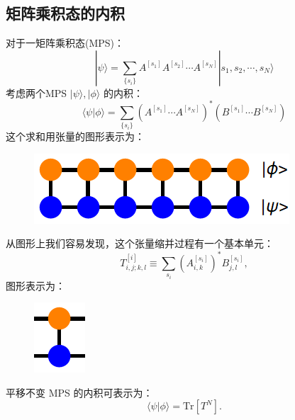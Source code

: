 \documentclass[UTF8]{ctexart}
\begin{document}
\subsection*{矩阵乘积态的内积}
\noindent
对于一矩阵乘积态(MPS)：
\begin{equation}
	|\psi\rangle = \sum_{\{s_i\}} A^{[s_1]}A^{[s_2]}\cdots A^{[s_N]} |s_1,s_2,\cdots,s_N\rangle
\end{equation}
考虑两个MPS $|\psi\rangle, |\phi\rangle$ 的内积：
\begin{equation}
	\langle\psi|\phi\rangle = \sum_{\{s_i\}} \left(A^{[s_1]}\cdots A^{[s_N]}\right)^* \left(B^{[s_1]}\cdots B^{[s_N]}\right)
\end{equation}
这个求和用张量的图形表示为：
\begin{figure}[H]
\begin{centering}
\includegraphics[width=0.5\linewidth]{include/mps-inner}
\par\end{centering}
\end{figure}
\noindent 
从图形上我们容易发现，这个张量缩并过程有一个基本单元：
\begin{equation}
	T^{[i]}_{i,j;k,l}\equiv \sum_{s_i} \left(A^{[s_i]}_{i,k}\right)^*B^{[s_i]}_{j,l},
\end{equation}
图形表示为：
\begin{figure}[H]
\begin{centering}
\includegraphics[width=0.1\linewidth]{include/mps-tm}
\par\end{centering}
\end{figure}
\noindent 
平移不变 MPS 的内积可表示为：
\begin{equation}
	\langle\psi|\phi\rangle = \mathrm{Tr}\left[ T^N \right].
\end{equation} 

 
\end{document}
